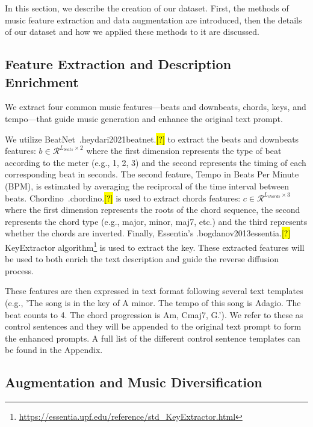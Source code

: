 \documentclass[11pt]{article}
\let\realcite\cite
\renewcommand{\cite}[1]{\ifx.#1.\hl{[?]}\else\realcite{#1}\fi}
\begin{document}
In this section, we describe the creation of our \dataset{} dataset. First, the methods of music feature extraction and data augmentation are introduced, then the details of our dataset and how we applied these methods to it are discussed.

\subsection{Feature Extraction and Description Enrichment}\label{sec:method_feature_extract}

We extract four common music features---beats and downbeats, chords, keys, and tempo---that guide music generation and enhance the original text prompt. 




We utilize BeatNet~\cite{heydari2021beatnet} to extract the beats and downbeats features: $b\in \mathcal{R}^{L_{beats}\times 2}$ where the first dimension represents the type of beat according to the meter (e.g., 1, 2, 3) and the second represents the timing of each corresponding beat in seconds. The second feature, Tempo in Beats Per Minute (BPM), is estimated by averaging the reciprocal of the time interval between beats. Chordino~\cite{chordino} is used to extract chords features: $c\in \mathcal{R}^{L_{chords}\times 3}$ where the first dimension represents the roots of the chord sequence, the second represents the chord type (e.g., major, minor, maj7, etc.) and the third represents whether the chords are inverted. Finally, Essentia's \cite{bogdanov2013essentia} KeyExtractor algorithm\footnote{\url{https://essentia.upf.edu/reference/std_KeyExtractor.html}} is used to extract the key. These extracted features will be used to both enrich the text description and guide the reverse diffusion process. 






These features are then expressed in text format following several text templates (e.g., 'The song is in the key of A minor. The tempo of this song is Adagio. The beat counts to 4. The chord progression is Am, Cmaj7, G.'). We refer to these as control sentences and they will be appended to the original text prompt to form the enhanced prompts. A full list of the different control sentence templates can be found in the Appendix.




\subsection{Augmentation and Music Diversification}\label{sec:method_data_aug}
\end{document}
